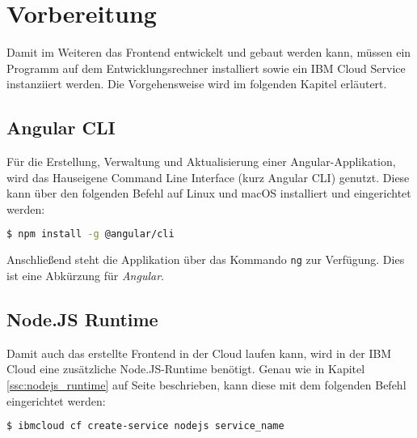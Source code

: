 \section{Vorbereitung}
Damit im Weiteren das Frontend entwickelt und gebaut werden kann, müssen ein Programm auf dem Entwicklungsrechner
installiert sowie ein IBM Cloud Service instanziiert werden. Die Vorgehensweise wird im folgenden Kapitel erläutert.

\subsection{Angular CLI}
Für die Erstellung, Verwaltung und Aktualisierung einer Angular-Applikation, wird das Hauseigene Command Line Interface
(kurz Angular CLI) genutzt. Diese kann über den folgenden Befehl auf Linux und macOS installiert und eingerichtet werden:

\begin{lstlisting}[language=bash, caption=Installation Angular CLI, label=Installation Angular CLI]
$ npm install -g @angular/cli
\end{lstlisting}

Anschließend steht die Applikation über das Kommando \texttt{ng} zur Verfügung. Dies ist eine Abkürzung für
\textit{Angular}.

\subsection{Node.JS Runtime}
Damit auch das erstellte Frontend in der Cloud laufen kann, wird in der IBM Cloud eine zusätzliche Node.JS-Runtime
benötigt. Genau wie in Kapitel \ref{ssc:nodejs_runtime} auf Seite \pageref{ssc:nodejs_runtime} beschrieben, kann diese
mit dem folgenden Befehl eingerichtet werden:

\begin{lstlisting}[language=bash, caption=Instanziierung der Node.JS Runtime, label=Instanziierung der Node.JS Runtime]
$ ibmcloud cf create-service nodejs service_name
\end{lstlisting}
